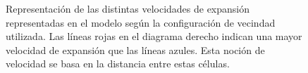 \begin{figure}[!ht]
\begin{center}
\end{center}\vspace*{-0.6cm}
\caption[Representaci\'on de las distintas velocidades de expansi\'on representadas en el modelo seg\'un la configuraci\'on de vecindad utilizada]{Representaci\'on de las distintas velocidades de expansi\'on representadas en el modelo seg\'un la configuraci\'on de vecindad utilizada. Las l\'ineas rojas en el diagrama derecho indican una mayor velocidad de expansi\'on que las l\'ineas azules. Esta noci\'on de velocidad se basa en la distancia entre estas c\'elulas.}
\label{fig-expansion-velocity}
\end{figure}

